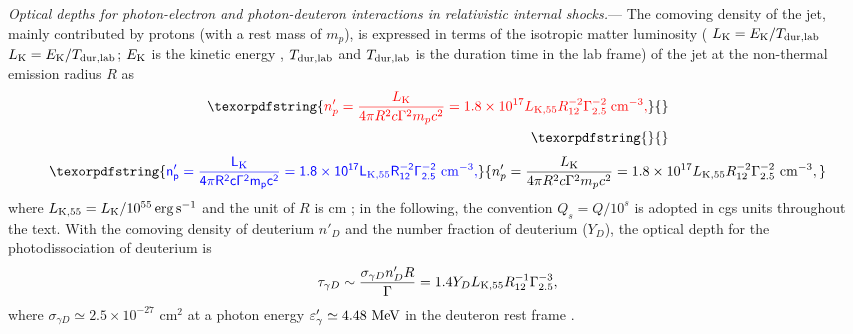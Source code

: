 \documentclass[prd,twocolumn,amsmath,amssymb,aps,linenumbers]{revtex4-2} %
\providecommand{\DIFaddtex}[1]{{\protect\color{blue} \sf #1}} %
\providecommand{\DIFdeltex}[1]{{\protect\color{red} \scriptsize #1}} %
\providecommand{\DIFaddbegin}{} %
\providecommand{\DIFaddend}{} %
\providecommand{\DIFdelbegin}{} %
\providecommand{\DIFdelend}{} %
\providecommand{\DIFadd}[1]{\texorpdfstring{\DIFaddtex{#1}}{#1}} %
\providecommand{\DIFdel}[1]{\texorpdfstring{\DIFdeltex{#1}}{}} %
\newcommand{\DIFscaledelfig}{0.5}
\newlength{\DIFdelgraphicswidth} %
\newlength{\DIFdelgraphicsheight} %
\newcommand{\DIFaddincludegraphics}[2][]{{\color{blue}\fbox{\DIFOincludegraphics[#1]{#2}}}} %
\newcommand{\DIFdelincludegraphics}[2][]{%
\sbox{\DIFdelgraphicsbox}{\DIFOincludegraphics[#1]{#2}}%
\settoboxwidth{\DIFdelgraphicswidth}{\DIFdelgraphicsbox} %
\settoboxtotalheight{\DIFdelgraphicsheight}{\DIFdelgraphicsbox} %
\scalebox{\DIFscaledelfig}{%
\parbox[b]{\DIFdelgraphicswidth}{\usebox{\DIFdelgraphicsbox}\\[-\baselineskip] \rule{\DIFdelgraphicswidth}{0em}}\llap{\resizebox{\DIFdelgraphicswidth}{\DIFdelgraphicsheight}{%
\setlength{\unitlength}{\DIFdelgraphicswidth}%
\begin{picture}(1,1)%
\thicklines\linethickness{2pt} %
{\color[rgb]{1,0,0}\put(0,0){\framebox(1,1){}}}%
{\color[rgb]{1,0,0}\put(0,0){\line( 1,1){1}}}%
{\color[rgb]{1,0,0}\put(0,1){\line(1,-1){1}}}%
\end{picture}%
}\hspace*{3pt}}} %
} %
\DeclareRobustCommand{\DIFaddbegin}{\DIFOaddbegin \let\includegraphics\DIFaddincludegraphics} %
\DeclareRobustCommand{\DIFaddend}{\DIFOaddend \let\includegraphics\DIFOincludegraphics} %
\DeclareRobustCommand{\DIFdelbegin}{\DIFOdelbegin \let\includegraphics\DIFdelincludegraphics} %
\DeclareRobustCommand{\DIFdelend}{\DIFOaddend \let\includegraphics\DIFOincludegraphics} %
\begin{document}
\textit{Optical depths for photon-electron and photon-deuteron interactions in relativistic internal shocks.}--- The comoving density of the jet, mainly contributed by protons (with a rest mass of $m_p$), is expressed in terms of the isotropic matter luminosity (\DIFdelbegin \DIFdel{$L_{\rm K}=E_{\rm K}/T_{\rm dur,\\lab}$}\DIFdelend \DIFaddbegin \DIFadd{$L_{\rm K}=E_{\rm K}/T_{\rm dur,lab}$}\DIFaddend ; $E_{\rm K}$ is the kinetic energy \DIFdelbegin \DIFdel{, $T_{\rm dur,\\lab}$ }\DIFdelend \DIFaddbegin \DIFadd{and $T_{\rm dur,lab}$ }\DIFaddend is the duration time in the lab frame) of the jet at the non-thermal emission radius $R$ as%
\DIFdelbegin \begin{align*}\DIFdel{%
 n^{\prime}_{p}=\frac{L_{\rm K}}{4\pi R^2 c \Gamma^2 m_p c^2}\nonumber
     =1.8\times 10^{17} L_{\rm K,55} R_{12}^{-2}\Gamma_{2.5}^{-2} \ \rm cm^{-3} , \nonumber}\\
\DIFdel{}\end{align*}%
\DIFdelend \DIFaddbegin \begin{equation}\DIFadd{\label{eq:nbp}
 n^{\prime}_{p}=\frac{L_{\rm K}}{4\pi R^2 c \Gamma^2 m_p c^2}
     =1.8\times 10^{17} L_{\rm K,55} R_{12}^{-2}\Gamma_{2.5}^{-2} \ {\rm cm^{-3}},
}\end{equation}\DIFaddend 
where $L_{\rm K,55}=L_{\rm K}/10^{55}{\,\rm erg\,s^{-1}}$ and the unit of $R$ is cm\DIFdelbegin \DIFdel{; in the following, the convention $Q_s = Q/10^s$ is adopted in cgs units throughout the text}\DIFdelend . With the comoving density of deuterium $n'_{D}$ and the number fraction of deuterium ($Y_{D}$),
the optical depth for the photodissociation of deuterium is 
\begin{equation}\label{eq:taugD}
  \tau_{\gamma D}\sim\frac{\sigma_{\gamma D} n'_ D R}{\Gamma}=1.4 Y_{D} L_{\rm K, 55} R_{12}^{-1} \Gamma_{2.5}^{-3},
\end{equation}
where $\sigma_{\gamma D}\simeq 2.5\times10^{-27}$ cm$^{2}$ at a photon energy
$\varepsilon'_\gamma \simeq 4.48~{\rm MeV}$ in the deuteron rest frame \cite{IAEA2000}. %
\end{document}
